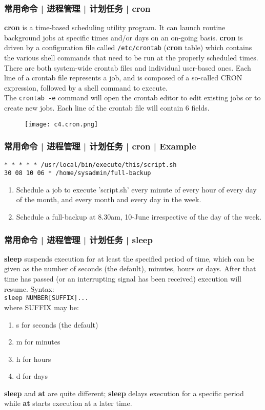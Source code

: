 \begin{frame}[fragile]
  \frametitle{常用命令 | 进程管理 | 计划任务 | cron}
  {\footnotesize
  \textbf{cron} is a time-based scheduling utility program. It can launch routine background jobs at specific times and/or days on an on-going basis.  \textbf{cron} is driven by a configuration file called \verb|/etc/crontab| (\textbf{cron} table) which contains the various shell commands that need to be run at the properly scheduled times. There are both system-wide crontab files and individual user-based ones. Each line of a crontab file represents a job, and is composed of a so-called CRON expression, followed by a shell command to execute.\\
  The \verb|crontab -e| command will open the crontab editor to edit existing jobs or to create new jobs. Each line of the crontab file will contain 6 fields.\\
  }
  \vspace{-0.2cm}
  \begin{figure}
    \centering
    \texttt{[image: c4.cron.png]}
  \end{figure}
\end{frame}

\begin{frame}[fragile]
  \frametitle{常用命令 | 进程管理 | 计划任务 | cron | Example}
\begin{lstlisting}
* * * * * /usr/local/bin/execute/this/script.sh
30 08 10 06 * /home/sysadmin/full-backup
\end{lstlisting}
\pause
\begin{enumerate}
  \item Schedule a job to execute 'script.sh' every minute of every hour of every day of the month, and every month and every day in the week.
  \item Schedule a full-backup at 8.30am, 10-June irrespective of the day of the week.
\end{enumerate}
\end{frame}

\begin{frame}[fragile]
  \frametitle{常用命令 | 进程管理 | 计划任务 | sleep}
  \textbf{sleep} suspends execution for at least the specified period of time, which can be given as the number of seconds (the default), minutes, hours or days. After that time has passed (or an interrupting signal has been received) execution will resume. Syntax:\\
  \vspace{0.1cm}
  \verb|sleep NUMBER[SUFFIX]...|\\
  \vspace{0.1cm}
  where SUFFIX may be:
  \begin{enumerate}
    \item s for seconds (the default)
    \item m for minutes
    \item h for hours
    \item d for days
  \end{enumerate}
  \textbf{sleep} and \textbf{at} are quite different; \textbf{sleep} delays execution for a specific period while \textbf{at} starts execution at a later time.
\end{frame}

